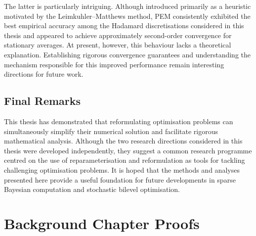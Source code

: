 \documentclass[11pt, twoside]{report}
\begin{document}
The latter is particularly intriguing. Although introduced primarily as a heuristic motivated by the Leimkuhler--Matthews method, PEM consistently exhibited the best empirical accuracy among the Hadamard discretisations considered in this thesis and appeared to achieve approximately second-order convergence for stationary averages. At present, however, this behaviour lacks a theoretical explanation. Establishing rigorous convergence guarantees and understanding the mechanism responsible for this improved performance remain interesting directions for future work.


\section{Final Remarks}

This thesis has demonstrated that reformulating optimisation problems can simultaneously simplify their numerical solution and facilitate rigorous mathematical analysis. Although the two research directions considered in this thesis were developed independently, they suggest a common research programme centred on the use of reparameterisation and reformulation as tools for tackling challenging optimisation problems. It is hoped that the methods and analyses presented here provide a useful foundation for future developments in sparse Bayesian computation and stochastic bilevel optimisation.






\appendix
\chapter{Background Chapter Proofs}
\end{document}
